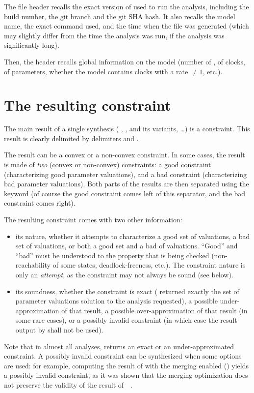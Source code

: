The file header recalls the exact version of \imitator{} used to run the analysis, including the build number, the git branch and the git SHA hash.
It also recalls the model name, the exact command used, and the time when the file was generated (which may slightly differ from the time the analysis was run, if the analysis was significantly long).

Then, the header recalls global information on the model (number of \IPTA{}, of clocks, of parameters, whether the model contains clocks with a rate $\neq 1$, etc.).


\section{The resulting constraint}

The main result of a single synthesis (\ie{} \EFsynth{}, \PDFC{}, \IM{} and its variants, \PRP{}…) is a constraint.
This result is clearly delimited by delimiters  and .

The result can be a convex or a non-convex constraint.
In some cases, the result is made of \emph{two} (convex or non-convex) constraints: a good constraint (characterizing good parameter valuations), and a bad constraint (characterizing bad parameter valuations).
Both parts of the results are then separated using the keyword  (of course the good constraint comes left of this separator, and the bad constraint comes right).

The resulting constraint comes with two other information:
\begin{itemize}
	\item its nature, \ie{} whether it attempts to characterize a good set of valuations, a bad set of valuations, or both a good set and a bad of valuations.
	      ``Good'' and ``bad'' must be understood to the property that is being checked (non-reachability of some states, deadlock-freeness, etc.).
	      The constraint nature is only an \emph{attempt}, as the constraint may not always be sound (see below).
	\item its soundness, \ie{} whether the constraint is exact (\imitator{} returned exactly the set of parameter valuations solution to the analysis requested), a possible under-approximation of that result, a possible over-approximation of that result (in some rare cases), or a possibly invalid constraint (in which case the result output by \imitator{} shall not be used).
\end{itemize}
Note that in almost all analyses, \imitator{} returns an exact or an under-approximated constraint.
A possibly invalid constraint can be synthesized when some options are used: for example, computing the result of \IM{} with the merging enabled () yields a possibly invalid constraint, as it was shown that the merging optimization does not preserve the validity of the result of~\IM{}~\cite{AFS13atva}.

